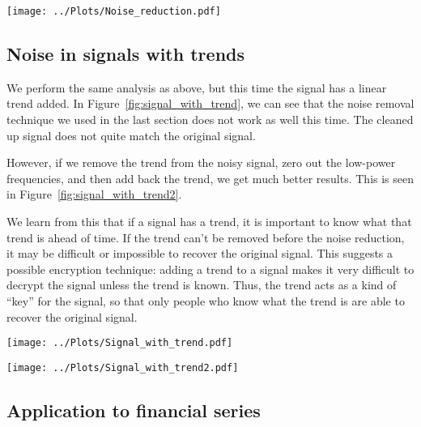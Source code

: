 \documentclass[twocolumn]{myarticle}
\begin{document}
\begin{figure*}[htb]
    \centering
    \texttt{[image: ../Plots/Noise\_reduction.pdf]}
    \caption{Use of Fourier transform to remove noise from a signal.}
    \label{fig:noise_reduction}
\end{figure*}

\subsection{Noise in signals with trends}
\label{subsec:noise_in_signals_with_trends}

We perform the same analysis as above, but this time the signal has a linear trend added.
In Figure~\ref{fig:signal_with_trend}, we can see that the noise removal technique we used in the last section does not work as well this time.
The cleaned up signal does not quite match the original signal.

However, if we remove the trend from the noisy signal, zero out the low-power frequencies, and then add back the trend, we get much better results.
This is seen in Figure~\ref{fig:signal_with_trend2}.

We learn from this that if a signal has a trend, it is important to know what that trend is ahead of time.
If the trend can't be removed before the noise reduction, it may be difficult or impossible to recover the original signal.
This suggests a possible encryption technique: adding a trend to a signal makes it very difficult to decrypt the signal unless the trend is known.
Thus, the trend acts as a kind of ``key'' for the signal, so that only people who know what the trend is are able to recover the original signal.

\begin{figure*}[htb]
    \centering
    \texttt{[image: ../Plots/Signal\_with\_trend.pdf]}
    \caption{Noise removed from a signal with a trend.}
    \label{fig:signal_with_trend}
\end{figure*}

\begin{figure*}[htb]
    \centering
    \texttt{[image: ../Plots/Signal\_with\_trend2.pdf]}
    \caption{Noise removed from a signal with a trend. This time the trend was removed before the noise was removed, and then added back in later.}
    \label{fig:signal_with_trend2}
\end{figure*}

\subsection{Application to financial series}
\label{subsec:application_to_financial_series}
\end{document}
